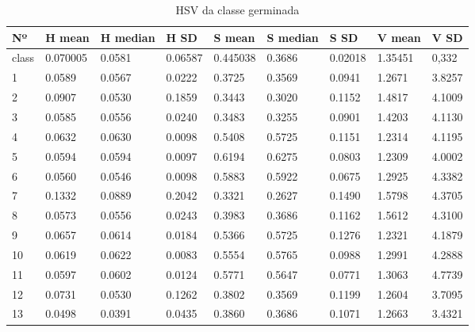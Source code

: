 \begin{anexosenv}
\begin{table}[htbp!]
\centering
\caption{HSV da classe  germinada}
\label{tab:cores_classe_germinada}
\begin{tabular}{|l|l|l|l|l|l|l|l|l|}
\hline
Nº & H mean & H median & H SD & S mean & S median & S SD & V mean & V SD \\ \hline
class & 0.070005 & 0.0581   & 0.06587              & 0.445038 & 0.3686   & 0.02018              & 1.35451 & 0,332                \\\hline
1    & 0.0589   & 0.0567   & 0.0222               & 0.3725   & 0.3569   & 0.0941               & 1.2671  & 3.8257               \\
2    & 0.0907   & 0.0530   & 0.1859               & 0.3443   & 0.3020   & 0.1152               & 1.4817  & 4.1009               \\
3    & 0.0585   & 0.0556   & 0.0240               & 0.3483   & 0.3255   & 0.0901               & 1.4203  & 4.1130               \\
4    & 0.0632   & 0.0630   & 0.0098               & 0.5408   & 0.5725   & 0.1151               & 1.2314  & 4.1195               \\
5    & 0.0594   & 0.0594   & 0.0097               & 0.6194   & 0.6275   & 0.0803               & 1.2309  & 4.0002               \\
6    & 0.0560   & 0.0546   & 0.0098               & 0.5883   & 0.5922   & 0.0675               & 1.2925  & 4.3382               \\
7    & 0.1332   & 0.0889   & 0.2042               & 0.3321   & 0.2627   & 0.1490               & 1.5798  & 4.3705               \\
8    & 0.0573   & 0.0556   & 0.0243               & 0.3983   & 0.3686   & 0.1162               & 1.5612  & 4.3100               \\
9    & 0.0657   & 0.0614   & 0.0184               & 0.5366   & 0.5725   & 0.1276               & 1.2321  & 4.1879               \\
10   & 0.0619   & 0.0622   & 0.0083               & 0.5554   & 0.5765   & 0.0988               & 1.2991  & 4.2888               \\
11   & 0.0597   & 0.0602   & 0.0124               & 0.5771   & 0.5647   & 0.0771               & 1.3063  & 4.7739               \\
12   & 0.0731   & 0.0530   & 0.1262               & 0.3802   & 0.3569   & 0.1199               & 1.2604  & 3.7095               \\
13   & 0.0498   & 0.0391   & 0.0435               & 0.3860   & 0.3686   & 0.1071               & 1.2663  & 3.4321               \\

\end{tabular}
\end{table}
\end{anexosenv}
